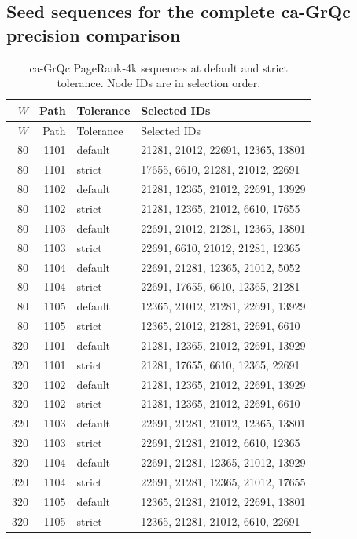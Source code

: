 \subsection{Seed sequences for the complete ca-GrQc precision comparison}
\begin{longtable}{rrll}
\caption{ca-GrQc PageRank-4k sequences at default and strict tolerance. Node IDs are in selection order.}\label{tab:precision-seeds}\\
\toprule $W$ & Path & Tolerance & Selected IDs \\ \midrule\endfirsthead
\toprule $W$ & Path & Tolerance & Selected IDs \\ \midrule\endhead
80 & 1101 & default & 21281, 21012, 22691, 12365, 13801 \\
80 & 1101 & strict & 17655, 6610, 21281, 21012, 22691 \\
80 & 1102 & default & 21281, 12365, 21012, 22691, 13929 \\
80 & 1102 & strict & 21281, 12365, 21012, 6610, 17655 \\
80 & 1103 & default & 22691, 21012, 21281, 12365, 13801 \\
80 & 1103 & strict & 22691, 6610, 21012, 21281, 12365 \\
80 & 1104 & default & 22691, 21281, 12365, 21012, 5052 \\
80 & 1104 & strict & 22691, 17655, 6610, 12365, 21281 \\
80 & 1105 & default & 12365, 21012, 21281, 22691, 13929 \\
80 & 1105 & strict & 12365, 21012, 21281, 22691, 6610 \\
320 & 1101 & default & 21281, 12365, 21012, 22691, 13929 \\
320 & 1101 & strict & 21281, 17655, 6610, 12365, 22691 \\
320 & 1102 & default & 21281, 12365, 21012, 22691, 13929 \\
320 & 1102 & strict & 21281, 12365, 21012, 22691, 6610 \\
320 & 1103 & default & 22691, 21281, 21012, 12365, 13801 \\
320 & 1103 & strict & 22691, 21281, 21012, 6610, 12365 \\
320 & 1104 & default & 22691, 21281, 12365, 21012, 13929 \\
320 & 1104 & strict & 22691, 21281, 12365, 21012, 17655 \\
320 & 1105 & default & 12365, 21281, 21012, 22691, 13801 \\
320 & 1105 & strict & 12365, 21281, 21012, 6610, 22691 \\

\end{longtable}

